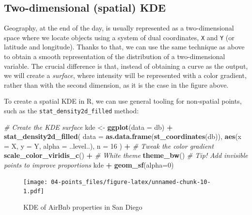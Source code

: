 \documentclass[
]{book}
\newenvironment{Shaded}{\begin{snugshade}}{\end{snugshade}}
\newcommand{\CommentTok}[1]{\textcolor[rgb]{0.56,0.35,0.01}{\textit{#1}}}
\newcommand{\DataTypeTok}[1]{\textcolor[rgb]{0.13,0.29,0.53}{#1}}
\newcommand{\DecValTok}[1]{\textcolor[rgb]{0.00,0.00,0.81}{#1}}
\newcommand{\KeywordTok}[1]{\textcolor[rgb]{0.13,0.29,0.53}{\textbf{#1}}}
\newcommand{\NormalTok}[1]{#1}
\newcommand{\OperatorTok}[1]{\textcolor[rgb]{0.81,0.36,0.00}{\textbf{#1}}}
\newcommand{\StringTok}[1]{\textcolor[rgb]{0.31,0.60,0.02}{#1}}
\begin{document}
\hypertarget{two-dimensional-spatial-kde}{%
\subsection{Two-dimensional (spatial) KDE}\label{two-dimensional-spatial-kde}}

Geography, at the end of the day, is usually represented as a two-dimensional space where we locate objects using a system of dual coordinates, \texttt{X} and \texttt{Y} (or latitude and longitude). Thanks to that, we can use the same technique as above to obtain a smooth representation of the distribution of a two-dimensional variable. The crucial difference is that, instead of obtaining a curve as the output, we will create a \emph{surface}, where intensity will be represented with a color gradient, rather than with the second dimension, as it is the case in the figure above.

To create a spatial KDE in R, we can use general tooling for non-spatial points, such as the \texttt{stat\_density2d\_filled} method:

\begin{Shaded}
\begin{Highlighting}[]
\CommentTok{# Create the KDE surface}
\NormalTok{kde <-}\StringTok{ }\KeywordTok{ggplot}\NormalTok{(}\DataTypeTok{data =}\NormalTok{ db) }\OperatorTok{+}
\StringTok{  }\KeywordTok{stat_density2d_filled}\NormalTok{(}
    \DataTypeTok{data =} \KeywordTok{as.data.frame}\NormalTok{(}\KeywordTok{st_coordinates}\NormalTok{(db)), }
    \KeywordTok{aes}\NormalTok{(}\DataTypeTok{x =}\NormalTok{ X, }\DataTypeTok{y =}\NormalTok{ Y, }\DataTypeTok{alpha =}\NormalTok{ ..level..),}
    \DataTypeTok{n =} \DecValTok{16}
\NormalTok{  ) }\OperatorTok{+}
\StringTok{  }\CommentTok{# Tweak the color gradient}
\StringTok{  }\KeywordTok{scale_color_viridis_c}\NormalTok{() }\OperatorTok{+}
\StringTok{  }\CommentTok{# White theme}
\StringTok{  }\KeywordTok{theme_bw}\NormalTok{()}
\CommentTok{# Tip! Add invisible points to improve proportions}
\NormalTok{kde }\OperatorTok{+}\StringTok{ }\KeywordTok{geom_sf}\NormalTok{(}\DataTypeTok{alpha=}\DecValTok{0}\NormalTok{)}
\end{Highlighting}
\end{Shaded}

\begin{figure}
\centering
\texttt{[image: 04-points\_files/figure-latex/unnamed-chunk-10-1.pdf]}
\caption{\label{fig:unnamed-chunk-10}KDE of AirBnb properties in San Diego}
\end{figure}
\end{document}
